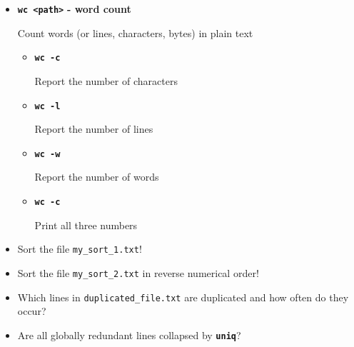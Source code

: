 \documentclass[aspectratio=1610]{beamer}
\newcommand\curtitle{}
\newcommand\command[1]{\alert{\textbf{\texttt{#1}}}}
\begin{document}

\begin{frame}[c]{\curtitle}
    \begin{itemize}[<+->]\setlength\itemsep{1em}
        \item \command{wc <path>} \textbf{- word count} 

            Count words (or lines, characters, bytes) in plain text
            \begin{itemize}[<.->]
                \item \command{wc -c}

                    Report the number of characters
                \item \command{wc -l}

                    Report the number of lines
                \item \command{wc -w}

                    Report the number of words
                \item \command{wc -c}

                    Print all three numbers
            \end{itemize}
    \end{itemize}
\end{frame}


\begin{frame}[c]{\curtitle}

    \begin{itemize}\setlength\itemsep{1.5em}
        \item [\leftpointright] Sort the file \alert{\texttt{my\_sort\_1.txt}}!

        \item [\leftpointright] Sort the file \alert{\texttt{my\_sort\_2.txt}} in reverse numerical
            order!

        \item [\leftpointright] Which lines in \alert{\texttt{duplicated\_file.txt}} are duplicated
            and how often do they occur?

        \item [\leftpointright] Are all globally redundant lines collapsed by \command{uniq}?
    \end{itemize}
\end{frame}
\end{document}
